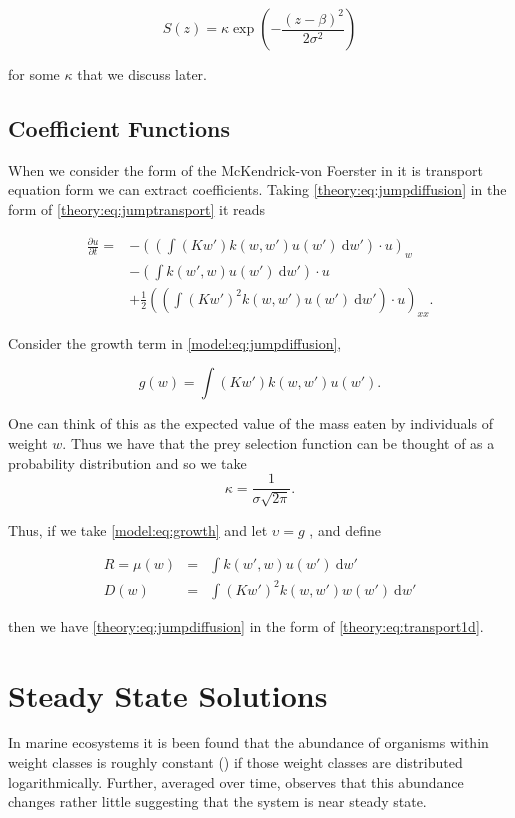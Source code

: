 \documentclass[../main]{subfiles}
\begin{document}
  \begin{equation}
    S(z) = \kappa \exp{\left( - \frac{(z - \beta)^2}{2 \sigma^2} \right)}
  \end{equation}

  for some $\kappa$ that we discuss later.

  \subsection{Coefficient Functions}
  When we consider the form of the McKendrick-von Foerster in it is transport equation form we can extract coefficients. Taking \autoref{theory:eq:jumpdiffusion} in the form of \autoref{theory:eq:jumptransport} it reads

  \begin{align}\label{model:eq:jumpdiffusion}
    \frac{\partial u}{\partial t} =
    & - \left( \left( \int (K w') k(w, w') u(w') \: \mathrm{d}w' \right) \cdot u \right)_w \nonumber \\
    & -  \left( \int k(w', w) u(w') \: \mathrm{d}w' \right) \cdot u \nonumber \\
    & + \frac{1}{2} \left( \left( \int (K w')^2 k(w, w') u(w') \: \mathrm{d}w' \right) \cdot u\right)_{xx}.
  \end{align}

  Consider the growth term in \autoref{model:eq:jumpdiffusion},

  \begin{equation}\label{model:eq:growth}
    g(w) = \int (K w') k(w, w') u(w').
  \end{equation}

  One can think of this as the expected value of the mass eaten by individuals of weight $w$. Thus we have that the prey selection function can be thought of as a probability distribution and so we take $$\kappa = \frac{1}{\sigma\sqrt{2 \pi}}.$$

  Thus, if we take \autoref{model:eq:growth} and let $\upsilon = g$ , and define

  \begin{eqnarray}
    R = \mu(w)  &=& \int k(w', w) u(w') \: \mathrm{d}w' \\
    D(w)    &=& \int (K w')^2 k(w, w') w(w') \: \mathrm{d}w'
  \end{eqnarray}

  then we have \autoref{theory:eq:jumpdiffusion} in the form of \autoref{theory:eq:transport1d}.

  \section{Steady State Solutions}
  In marine ecosystems it is been found that the abundance of organisms within weight classes is roughly constant (\cite{sheldon1972}) if those weight classes are distributed logarithmically. Further, averaged over time, \cite{datta2011} observes that this abundance changes rather little suggesting that the system is near steady state.
\end{document}
